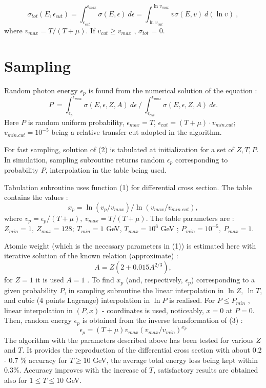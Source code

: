 \begin{equation}
\sigma_{tot} (E, \epsilon_{cut})
= \int_{\epsilon_{cut}}^{\epsilon_{max}}  \sigma (E,\epsilon )  \: d \epsilon  =
 \int_{\ln v_{cut}}^{\ln v_{max}}  v \sigma (E, v )  \: d (\ln v)\:,
\end{equation}
where $v_{max}=T/(T+ \mu)$. If $v_{cut} \geq v_{max}$ , $\sigma_{tot}$ = 0.

\section{Sampling}

Random photon energy $\epsilon_{p}$ is found from the numerical solution
of the equation :
$$ P \:= \int_{\epsilon_{p}}^{\epsilon_{max}}  \sigma (E,\epsilon,Z,A )  \: d \epsilon \: 
 / \: \int_{\epsilon_{cut.}}^{\epsilon_{max}}  \sigma (E,\epsilon,Z,A )  \: d \epsilon .
$$
%
Here $P$ is random uniform probability, $\epsilon_{max}=T$,
$\epsilon_{cut}=(T+\mu) \cdot v_{min.cut}$;
$v_{min.cut}=10^{-5}$ being a relative transfer cut adopted 
in the algorithm.

For fast sampling, solution of (2) is tabulated at initialization 
for a set of $Z,T,P$. In simulation, sampling subroutine returns random 
$\epsilon_{p}$ corresponding to probability $P$,
interpolation in the table being used.

Tabulation subroutine uses function (1) for differential 
cross section. The table contains the values :
\begin{equation}
 x_{p} = \ln (v_{p} / v_{max})/\ln (v_{max}/v_{min.cut}),
\end{equation}
where $v_{p}= \epsilon_{p}/(T+ \mu),\: v_{max} = T/(T+ \mu).$ 
The table parameters are : $Z_{min}=1, \: Z_{max}=128; \:
T_{min}=1$ GeV, $T_{max}=10^{6}$ GeV ;
$P_{min}=10^{-5}, \: P_{max}=1.$

Atomic weight (which is the necessary parameters in (1)) is estimated
here with iterative solution of the known relation (approximate) :
$$ A = Z (2+0.015 A^{2/3}),$$
for $Z=1$ it is used $A=1$ .
%
To  find $x_{p}$ (and, respectively, $\epsilon_{p}$) corresponding to 
a given probability $P$, in sampling subroutine the linear
interpolation in $\ln Z, \: \ln T$, and cubic (4 points Lagrange) interpolation 
in $\ln P$ is realised. For $P \leq P_{min}$ , linear interpolation 
in $(P,x)$ - coordinates is used, noticeably, $x = 0$ at $P = 0$.
Then, random energy $\epsilon_{p}$ is obtained from the inverse
transformation of (3) :
%
$$\epsilon_{p} = (T+ \mu ) v_{max} (v_{max}/v_{min})^{x_{p}} $$
%
The algorithm with the parameters described above has been
tested for various $Z$ and $T$. It provides the reproduction 
of the differential cross section with about 0.2 - 0.7 \% 
accuracy for $T \geq 10$ GeV, the average total energy loss 
being kept within 0.3\%. Accuracy improves with the increase
of $T$, satisfactory results are obtained also for
$1 \leq T \leq 10$ GeV.


